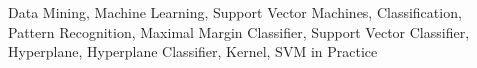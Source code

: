 \begin{keywords}
    Data Mining,
    Machine Learning,
    Support Vector Machines,
    Classification,
    Pattern Recognition,
    Maximal Margin Classifier,
    Support Vector Classifier,
    Hyperplane,
    Hyperplane Classifier,
    Kernel,
    SVM in Practice
\end{keywords}